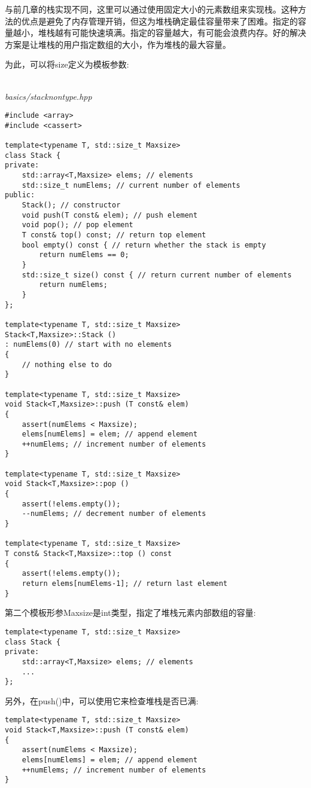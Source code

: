 与前几章的栈实现不同，这里可以通过使用固定大小的元素数组来实现栈。这种方法的优点是避免了内存管理开销，但这为堆栈确定最佳容量带来了困难。指定的容量越小，堆栈越有可能快速填满。指定的容量越大，有可能会浪费内存。好的解决方案是让堆栈的用户指定数组的大小，作为堆栈的最大容量。

为此，可以将size定义为模板参数:

\hspace*{\fill} \\ %
\noindent
\textit{basics/stacknontype.hpp}
\begin{lstlisting}[style=styleCXX]
#include <array>
#include <cassert>

template<typename T, std::size_t Maxsize>
class Stack {
private:
	std::array<T,Maxsize> elems; // elements
	std::size_t numElems; // current number of elements
public:
	Stack(); // constructor
	void push(T const& elem); // push element
	void pop(); // pop element
	T const& top() const; // return top element
	bool empty() const { // return whether the stack is empty
		return numElems == 0;
	}
	std::size_t size() const { // return current number of elements
		return numElems;
	}
};

template<typename T, std::size_t Maxsize>
Stack<T,Maxsize>::Stack ()
: numElems(0) // start with no elements
{
	// nothing else to do
}

template<typename T, std::size_t Maxsize>
void Stack<T,Maxsize>::push (T const& elem)
{
	assert(numElems < Maxsize);
	elems[numElems] = elem; // append element
	++numElems; // increment number of elements
}

template<typename T, std::size_t Maxsize>
void Stack<T,Maxsize>::pop ()
{
	assert(!elems.empty());
	--numElems; // decrement number of elements
}

template<typename T, std::size_t Maxsize>
T const& Stack<T,Maxsize>::top () const
{
	assert(!elems.empty());
	return elems[numElems-1]; // return last element
}
\end{lstlisting}

第二个模板形参Maxsize是int类型，指定了堆栈元素内部数组的容量:

\begin{lstlisting}[style=styleCXX]
template<typename T, std::size_t Maxsize>
class Stack {
private:
	std::array<T,Maxsize> elems; // elements
	...
};
\end{lstlisting}

另外，在push()中，可以使用它来检查堆栈是否已满:

\begin{lstlisting}[style=styleCXX]
template<typename T, std::size_t Maxsize>
void Stack<T,Maxsize>::push (T const& elem)
{
	assert(numElems < Maxsize);
	elems[numElems] = elem; // append element
	++numElems; // increment number of elements
}
\end{lstlisting}


